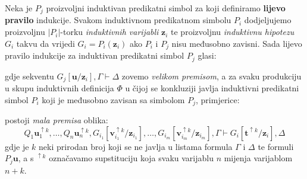 Neka je \(P_{j}\) proizvoljni induktivan predikatni simbol za koji definiramo \textbf{lijevo pravilo} indukcije.
Svakom induktivnom predikatnom simbolu \(P_{i}\) dodjeljujemo
proizvoljnu \(|P_{i}|\)-torku \textit{induktivnih varijabli} \(\mathbf{z}_{i}\) te
proizvoljnu \textit{induktivnu hipotezu} \(G_{i}\) takvu da
vrijedi \(G_{i} = P_{i}(\mathbf{z}_{i})\) ako \(P_{i}\) i \(P_{j}\) nisu međusobno zavisni.
Sada lijevo pravilo indukcije za induktivan predikatni simbol \(P_{j}\) glasi:
\begin{prooftree}
\end{prooftree}
\noindent gdje sekventu \( G_{j} [\mathbf{u} / \mathbf{z}_{i}] , \Gamma  \vdash \Delta\) zovemo \textit{velikom premisom},
a za svaku produkciju u skupu induktivnih definicija \(\Phi\) u čijoj se konkluziji javlja
induktivni predikatni simbol \(P_{i}\) koji je međusobno zavisan sa simbolom \(P_{j}\), primjerice:
\begin{prooftree}
\end{prooftree}
\noindent postoji \textit{mala premisa} oblika:
\[
  Q_{1} \mathbf{u}_{1}^{\uparrow k}, \ldots, Q_{n} \mathbf{u}_{n}^{\uparrow k},
  G_{i_{1}}[ \mathbf{v}_{i_{1}}^{\uparrow k} / \mathbf{z}_{i_{1}} ], \ldots, G_{i_{m}}[ \mathbf{v}_{i_{m}}^{\uparrow k} / \mathbf{z}_{i_{m}} ],
  \Gamma \vdash G_{i}[\mathbf{t}^{\uparrow k} / \mathbf{z}_{i}], \Delta
\]
\noindent gdje je \(k\) neki prirodan broj koji se ne javlja u listama formula \(\Gamma\) i \(\Delta\) te formuli \(P_{j}\mathbf{u}\),
a s \(^{\uparrow k}\) označavamo supstituciju koja svaku varijablu \(n\) mijenja varijablom \(n + k\).

